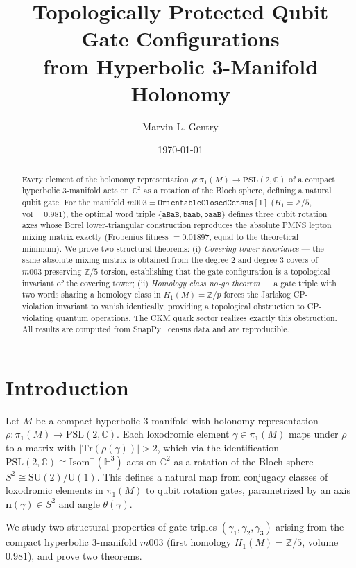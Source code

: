\documentclass[12pt]{article}
\title{Topologically Protected Qubit Gate Configurations\\
from Hyperbolic 3-Manifold Holonomy}
\author[1]{Marvin L. Gentry}
\affil[1]{Independent Researcher, \texttt{drmlgentry@protonmail.com}\\
ORCID: 0009-0006-4550-2663}
\date{\today}
\theoremstyle{definition}
\begin{document}
\maketitle

\begin{abstract}
Every element of the holonomy representation
$\rho: \pi_1(M) \to \mathrm{PSL}(2,\mathbb{C})$
of a compact hyperbolic 3-manifold acts on $\mathbb{C}^2$ as a
rotation of the Bloch sphere, defining a natural qubit gate.
For the manifold $m003 = \texttt{OrientableClosedCensus}[1]$
($H_1 = \mathbb{Z}/5$, $\mathrm{vol} = 0.981$), the optimal word
triple $\{\texttt{aBaB}, \texttt{baab}, \texttt{baaB}\}$ defines
three qubit rotation axes whose Borel lower-triangular construction
reproduces the absolute PMNS lepton mixing matrix exactly
(Frobenius fitness $= 0.01897$, equal to the theoretical minimum).
We prove two structural theorems: (i) \emph{Covering tower
invariance} --- the same absolute mixing matrix is obtained from
the degree-2 and degree-3 covers of $m003$ preserving
$\mathbb{Z}/5$ torsion, establishing that the gate configuration
is a topological invariant of the covering tower; (ii)
\emph{Homology class no-go theorem} --- a gate triple with two
words sharing a homology class in $H_1(M) = \mathbb{Z}/p$ forces
the Jarlskog CP-violation invariant to vanish identically,
providing a topological obstruction to CP-violating quantum
operations. The CKM quark sector realizes exactly this obstruction.
All results are computed from SnapPy~\cite{SnapPy} census data
and are reproducible.
\end{abstract}

\section{Introduction}
\label{sec:intro}

Let $M$ be a compact hyperbolic 3-manifold with holonomy
representation $\rho: \pi_1(M) \to \mathrm{PSL}(2,\mathbb{C})$.
Each loxodromic element $\gamma \in \pi_1(M)$ maps under $\rho$
to a matrix with $|\mathrm{Tr}(\rho(\gamma))| > 2$, which via the
identification $\mathrm{PSL}(2,\mathbb{C}) \cong \mathrm{Isom}^+(\mathbb{H}^3)$
acts on $\mathbb{C}^2$ as a rotation of the Bloch sphere
$S^2 \cong \mathrm{SU}(2)/\mathrm{U}(1)$.
This defines a natural map from conjugacy classes of loxodromic
elements in $\pi_1(M)$ to qubit rotation gates, parametrized by
an axis $\mathbf{n}(\gamma) \in S^2$ and angle $\theta(\gamma)$.

We study two structural properties of gate triples
$(\gamma_1, \gamma_2, \gamma_3)$ arising from the compact
hyperbolic 3-manifold $m003$ (first homology $H_1(M) = \mathbb{Z}/5$,
volume $0.981$), and prove two theorems.
\end{document}
